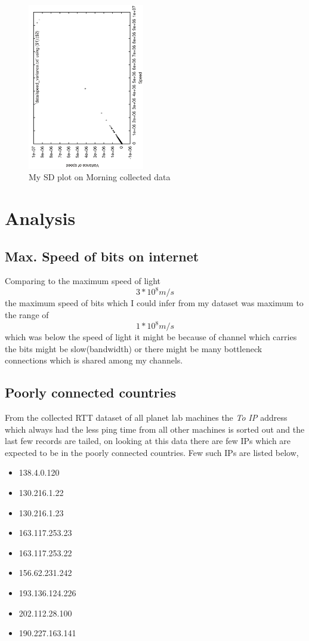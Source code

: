 \documentclass[twocolumn]{article}
\begin{document}
\begin{figure}
\centering
\includegraphics[width=2in,angle=270]{speed_sd_plot_morning.pdf}
\caption{My SD plot on Morning collected data}
\label{figure:sd_morning}
\end{figure}


\section{Analysis}

\subsection{Max. Speed of bits on internet}
Comparing to the maximum speed of light $$ {3*10^8 m/s} $$ the maximum speed of bits which I could infer from my dataset was maximum to the range of $$ {1*10^8 m/s} $$ which was below the speed of light it might be because of channel which carries the bits might be slow(bandwidth) or there might be many bottleneck connections which is shared among my channels.

\subsection{Poorly connected countries}
From the collected RTT dataset of all planet lab machines the \textit{To IP} address which always had the less ping time from all other machines is sorted out and the last few records are tailed, on looking at this data there are few IPs which are expected to be in the poorly connected countries. Few such IPs are listed below,
\begin{itemize}
\item 138.4.0.120
\item 130.216.1.22
\item 130.216.1.23
\item 163.117.253.23
\item 163.117.253.22
\item 156.62.231.242
\item 193.136.124.226
\item 202.112.28.100
\item 190.227.163.141
\end{itemize}
\end{document}
